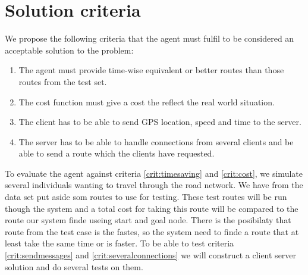 \section{Solution criteria}\label{chap:solutioncriteria}
We propose the following criteria that the agent must fulfil to be considered an acceptable solution to the problem:

\begin{enumerate}
\item The agent must provide time-wise equivalent or better routes than those routes from the test set.\label{crit:timesaving}
\item The cost function must give a cost the reflect the real world situation.\label{crit:cost}
\item The client has to be able to send GPS location, speed and time to the server.\label{crit:sendmessages}
\item The server has to be able to handle connections from several clients and be able to send a route which the clients have requested.\label{crit:severalconnections}
\end{enumerate}

To evaluate the agent against criteria \ref{crit:timesaving} and \ref{crit:cost}, we simulate several individuals wanting to travel through the road network. We have from the data set put aside som routes to use for testing. These test routes will be run though the system and a total cost for taking this route will be compared to the route our system finde useing start and goal node. There is the posibilaty that route from the test case is the fastes, so the system need to finde a route that at least take the same time or is faster.
To be able to test criteria \ref{crit:sendmessages} and \ref{crit:severalconnections} we will construct a client server solution and do several tests on them. 

